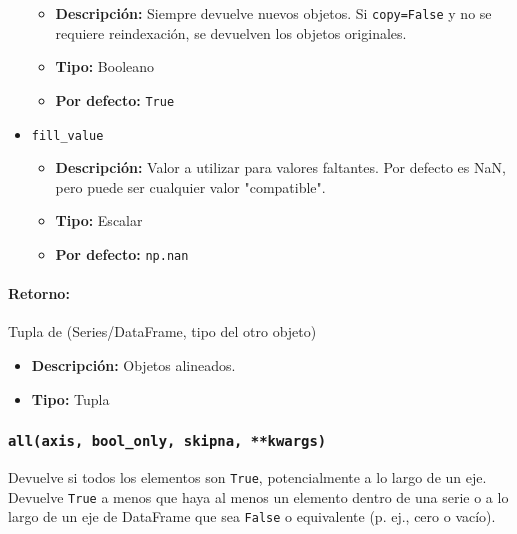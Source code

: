 \begin{itemize}
                \begin{itemize}
                    \item \textbf{Descripción:} Siempre devuelve nuevos objetos. Si \texttt{copy=False} y no se requiere reindexación, se devuelven los objetos originales.
                    \item \textbf{Tipo:} Booleano
                    \item \textbf{Por defecto:} \texttt{True}
                \end{itemize}
            \item \texttt{fill\_value}
                \begin{itemize}
                    \item \textbf{Descripción:} Valor a utilizar para valores faltantes. Por defecto es NaN, pero puede ser cualquier valor "compatible".
                    \item \textbf{Tipo:} Escalar
                    \item \textbf{Por defecto:} \texttt{np.nan}
                \end{itemize}
        \end{itemize}

        \paragraph{Retorno:} Tupla de (Series/DataFrame, tipo del otro objeto)
        \begin{itemize}
            \item \textbf{Descripción:} Objetos alineados.
            \item \textbf{Tipo:} Tupla
        \end{itemize}


        \subsubsection{\texttt{all(axis, bool\_only, skipna, **kwargs)}}
        Devuelve si todos los elementos son \texttt{True}, potencialmente a lo largo de un eje. Devuelve \texttt{True} a menos que haya al menos un elemento dentro de una serie o a lo largo de un eje de DataFrame que sea \texttt{False} o equivalente (p. ej., cero o vacío).

